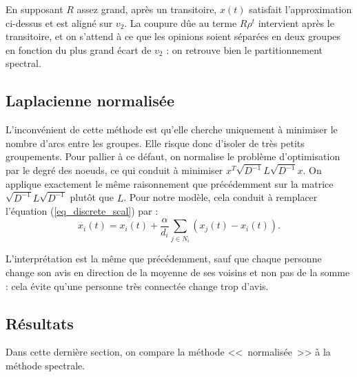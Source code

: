 \documentclass[12pt]{article}
\begin{document}
En supposant $R$ assez grand, après un transitoire, $x(t)$ satisfait
l'approximation ci-dessus et est aligné sur $v_2$. La coupure dûe au
terme $R \rho^t$ intervient après le transitoire, et on s'attend à ce
que les opinions soient séparées en deux groupes en fonction du plus
grand écart de $v_2$ : on retrouve bien le partitionnement spectral.

\subsection{Laplacienne normalisée}
L'inconvénient de cette méthode est qu'elle cherche uniquement à
minimiser le nombre d'arcs entre les groupes. Elle risque donc
d'isoler de très petits groupements. Pour pallier à ce défaut, on
normalise le problème d'optimisation par le degré des noeuds, ce qui
conduit à minimiser $x^T \sqrt{D^{-1}} L \sqrt{D^{-1}} x$. On applique
exactement le même raisonnement que précédemment sur la matrice
$\sqrt{D^{-1}} L \sqrt{D^{-1}}$ plutôt que $L$. Pour notre modèle,
cela conduit à remplacer l'équation (\ref{eq_discrete_scal}) par :
\begin{equation}
 \label{eq_discrete_scal_renorm}
 x_i(t) = x_i(t) + \frac{\alpha}{d_i} \sum_{j \in N_i} (x_j(t) - x_i(t)).
\end{equation}

L'interprétation est la même que précédemment, sauf que chaque
personne change son avis en direction de la moyenne de ses voisins et
non pas de la somme : cela évite qu'une personne très connectée change
trop d'avis.
\subsection{Résultats}
Dans cette dernière section, on compare la méthode <<~normalisée~>> à la
méthode spectrale.
\end{document}
